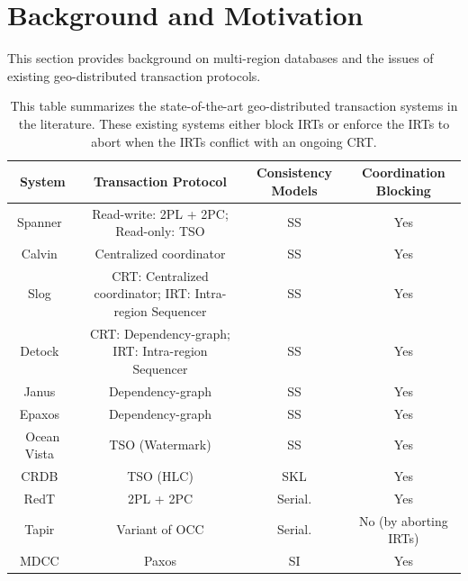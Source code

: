 \section{Background and Motivation}\label{sec:background}
This section provides background on multi-region databases and the issues of existing geo-distributed transaction protocols. 


\begin{table}[]
  \renewcommand\arraystretch{1.15}
    \begin{tabular}{cccc} \hline
    System      & Transaction Protocol                                        & Consistency  Models       & Coordination Blocking \\ \hline
    Spanner~\cite{spanner:osdi12}     & Read-write: 2PL + 2PC;  Read-only:   TSO                    & SS        & Yes                         \\
    Calvin~\cite{calvin:sigmod12}      & Centralized coordinator                                     & SS        & Yes                         \\
    Slog~\cite{slog:vldb19}        & CRT: Centralized coordinator;  IRT:   Intra-region Sequencer & SS        & Yes                         \\
    Detock~\cite{nguyen2023detock}      & CRT: Dependency-graph;  IRT:   Intra-region Sequencer        & SS        & Yes                         \\
    Janus~\cite{janus:osdi16}       & Dependency-graph                                            & SS        & Yes                         \\
    Epaxos~\cite{epaxos:sosp13}      & Dependency-graph                                            & SS        & Yes                        \\
    Ocean Vista~\cite{ov:vldb19} & TSO  (Watermark)                                            & SS        & Yes                         \\
    CRDB~\cite{taft2020cockroachdb}        & TSO (HLC)                                                   & SKL & Yes                         \\
    RedT~\cite{zhang2023redt}        & 2PL + 2PC                                                   & Serial.              & Yes                         \\
    Tapir~\cite{tapir:tocs}       & Variant of OCC                                              & Serial.              & No (by aborting IRTs)      \\
    MDCC~\cite{mdcc:eurosys13}        & Paxos                                                       & SI      & Yes            \\  \hline          
    \end{tabular}
    \caption{This table summarizes the state-of-the-art geo-distributed transaction systems in the literature. These existing systems either block  IRTs or enforce the IRTs to abort when the IRTs conflict with an ongoing CRT.}\label{tab:compare}
    \vspace{-5pt}
\end{table}

